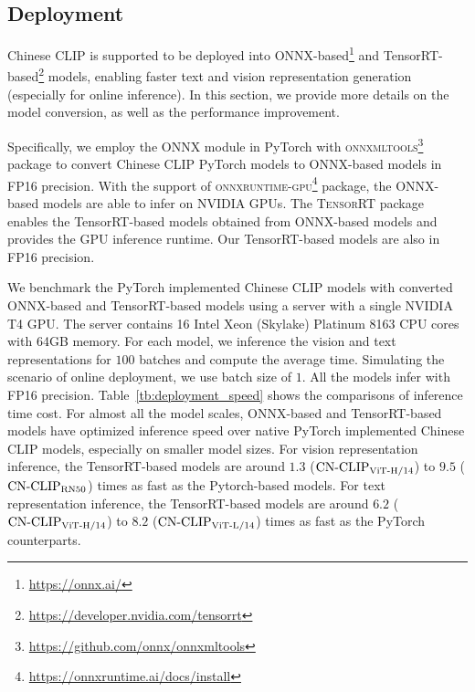 \subsection{Deployment}
\label{appendix:deployment}

Chinese CLIP is supported to be deployed into ONNX-based\footnote{\url{https://onnx.ai/}} and TensorRT-based\footnote{\url{https://developer.nvidia.com/tensorrt}} models, enabling faster text and vision representation generation (especially for online inference). In this section, we provide more details on the model conversion, as well as the performance improvement. 

Specifically, we employ the ONNX module in PyTorch with \textsc{onnxmltools}\footnote{\url{https://github.com/onnx/onnxmltools}} package to convert Chinese CLIP PyTorch models to ONNX-based models in FP16 precision. With the support of \textsc{onnxruntime-gpu}\footnote{\url{https://onnxruntime.ai/docs/install}} package, the ONNX-based models are able to infer on NVIDIA GPUs. The \textsc{TensorRT} package enables the TensorRT-based models obtained from ONNX-based models and provides the GPU inference runtime. Our TensorRT-based models are also in FP16 precision.

We benchmark the PyTorch implemented Chinese CLIP models with converted ONNX-based and TensorRT-based models using a server with a single NVIDIA T4 GPU. The server contains \num{16} Intel Xeon (Skylake) Platinum 8163 CPU cores with \num{64}GB memory. For each model, we inference the vision and text representations for $100$ batches and compute the average time. Simulating the scenario of online deployment, we use batch size of $1$. All the models infer with FP16 precision. Table~\ref{tb:deployment_speed} shows the comparisons of inference time cost. For almost all the model scales, ONNX-based and TensorRT-based models have optimized inference speed over native PyTorch implemented Chinese CLIP models, especially on smaller model sizes. For vision representation inference, the TensorRT-based models are around $1.3$ ($\text{CN-CLIP}\rm_{ViT\text{-}H/14}$) to $9.5$ ($\text{CN-CLIP}\rm_{RN50}$) times as fast as the Pytorch-based models. For text representation inference, the TensorRT-based models are around $6.2$ ($\text{CN-CLIP}\rm_{ViT\text{-}H/14}$) to $8.2$ ($\text{CN-CLIP}\rm_{ViT\text{-}L/14}$) times as fast as the PyTorch counterparts.



